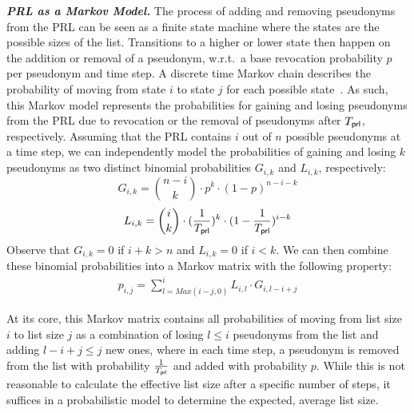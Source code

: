 \noindent\textbf{\emph{PRL as a Markov Model.}}
%
The process of adding and removing pseudonyms from the \ac{PRL} can be seen as a
finite state machine where the states are the possible sizes of the list.
Transitions to a higher or lower state then happen on the addition or removal of
a pseudonym, w.r.t.~a base revocation probability $p$ per pseudonym and time step.  
A discrete time Markov chain describes the probability of moving
from state $i$ to state $j$ for each possible state~\cite{hermanns2002markov}.
As such, this Markov model represents the probabilities for gaining and losing
pseudonyms from the PRL due to revocation or the removal of pseudonyms after
$\emph{$T_{\mathsf{prl}}$}{}$, respectively.
%
%
Assuming that the PRL contains $i$ out of $n$ possible pseudonyms at a time
step, we can independently model the probabilities of gaining and losing $k$
pseudonyms as two distinct binomial probabilities $G_{i,k}$ and $L_{i,k}$,
respectively: %
\begin{equation}
    \label{eq:prl-size-g}
    G_{i,k} = \binom{n-i}{k} \cdot p^k \cdot (1-p)^{n-i-k}  
\end{equation}
\begin{equation}
    \label{eq:prl-size-l}
    L_{i,k} = \binom{i}{k} \cdot (\frac{1}{\paramtprl{}})^{k} \cdot (1-\frac{1}{\paramtprl{}})^{i-k} 
\end{equation}
Observe that $G_{i,k}=0$ if $i+k>n$ and $L_{i,k}=0$ if $i<k$.  We can then
combine these binomial probabilities into a Markov matrix with the following
property:
\begin{align}
    \label{eq:prl-size-markov}
    p_{i,j} = \sum_{l=Max(i-j, 0)}^{i} L_{i,l} \cdot G_{i,l-i+j}
\end{align}

At its core, this Markov matrix contains all probabilities of moving from list
size $i$ to list size $j$ as a combination of losing $l\leq i$ pseudonyms from
the list and adding $l-i+j\leq j$ new ones,   
where in each time step, a pseudonym is removed from the list with probability
$\frac{1}{\emph{$T_{\mathsf{prl}}$}{}}$ and added with probability $p$.  While this is not
reasonable to calculate the effective list size after a specific number of
steps, it suffices in a probabilistic model to determine the expected, average
list size.

